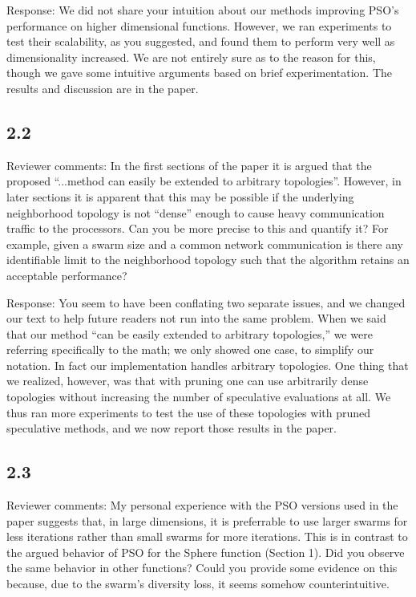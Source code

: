 \documentclass[onecolumn, 12pt]{article}
\begin{document}
Response: We did not share your intuition about our methods improving PSO's
performance on higher dimensional functions.  However, we ran experiments to
test their scalability, as you suggested, and found them to perform very well
as dimensionality increased.  We are not entirely sure as to the reason for
this, though we gave some intuitive arguments based on brief experimentation.
The results and discussion are in the paper.

\subsection*{2.2}

Reviewer comments: In the first sections of the paper it is argued that the
proposed ``...method can easily be extended to arbitrary topologies''. However,
in later sections it is apparent that this may be possible if the underlying
neighborhood topology is not ``dense'' enough to cause heavy communication
traffic to the processors.  Can you be more precise to this and quantify it?
For example, given a swarm size and a common network communication is there any
identifiable limit to the neighborhood topology such that the algorithm retains
an acceptable performance?

Response: You seem to have been conflating two separate issues, and we changed
our text to help future readers not run into the same problem.  When we said
that our method ``can be easily extended to arbitrary topologies,'' we were
referring specifically to the math; we only showed one case, to simplify our
notation.  In fact our implementation handles arbitrary topologies.  One thing
that we realized, however, was that with pruning one can use arbitrarily dense
topologies without increasing the number of speculative evaluations at all.  We
thus ran more experiments to test the use of these topologies with pruned
speculative methods, and we now report those results in the paper.

\subsection*{2.3}

Reviewer comments: My personal experience with the PSO versions used in the
paper suggests that, in large dimensions, it is preferrable to use larger
swarms for less iterations rather than small swarms for more iterations. This
is in contrast to the argued behavior of PSO for the Sphere function (Section
1).  Did you observe the same behavior in other functions?  Could you provide
some evidence on this because, due to the swarm's diversity loss, it seems
somehow counterintuitive.
\end{document}
